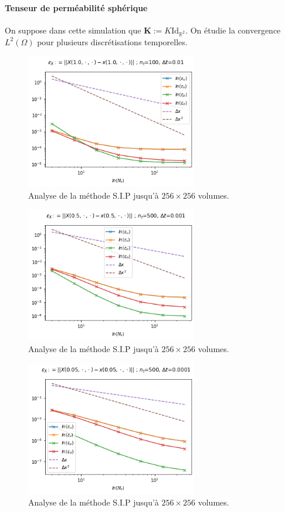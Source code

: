 \paragraph{Tenseur de perméabilité sphérique} On suppose dans cette simulation que $\mathbf{K} := K \text{Id}_{\mathbb{R}^2}$. On étudie la convergence $L^2(\Omega)$ pour plusieurs discrétisations temporelles.
\begin{figure}[htp]
    \centering
    \includegraphics[width=7.5cm]{Images/brinkman/spherique/erreurs (2).png}
    \caption{Analyse de la méthode S.I.P jusqu'à $256 \times 256$ volumes.}
\end{figure}

\begin{figure}[htp]
    \centering
    \includegraphics[width=7.5cm]{Images/brinkman/spherique/erreurs (3).png}
    \caption{Analyse de la méthode S.I.P jusqu'à $256 \times 256$ volumes.}
\end{figure}

\begin{figure}[htp]
    \centering
    \includegraphics[width=7.5cm]{Images/brinkman/spherique/erreurs (4).png}
    \caption{Analyse de la méthode S.I.P jusqu'à $256 \times 256$ volumes.}
\end{figure}

